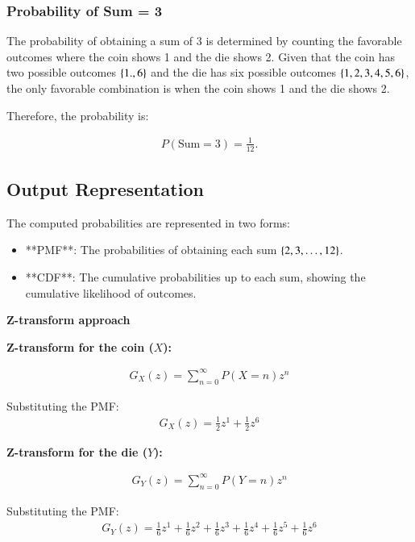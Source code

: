 \documentclass[journal]{IEEEtran}
\begin{document}
\subsubsection*{Probability of Sum = 3}
The probability of obtaining a sum of 3 is determined by counting the favorable outcomes where  the coin shows 1 and the die shows 2. Given that the coin has two possible outcomes $\left\{1.,6\right\}$ and the die has six possible outcomes $\left\{1,2,3,4,5,6\right\}$, the only favorable combination is when the coin shows 1 and the die shows 2.

Therefore, the probability is:

\begin{align}
    P(\text{Sum} = 3) = \frac{1}{12}.
\end{align}


\subsection*{Output Representation}
The computed probabilities are represented in two forms:
\begin{itemize}
    \item **PMF**: The probabilities of obtaining each sum $\left\{2, 3, \ldots, 12\right\}$.
    \item **CDF**: The cumulative probabilities up to each sum, showing the cumulative likelihood of outcomes.
\end{itemize}
\textbf{Z-transform approach}

\textbf{Z-transform for the coin (\(X\)):}

\begin{align}
    G_X(z) = \sum_{n=0}^\infty P(X=n) z^n
\end{align}



Substituting the PMF:
\begin{align}
    G_X(z) = \frac{1}{2}z^1 + \frac{1}{2}z^6
\end{align}

\textbf{Z-transform for the die (\(Y\)):}

\begin{align}
    G_Y(z) = \sum_{n=0}^\infty P(Y=n) z^n
\end{align}

Substituting the PMF:
\begin{align}
   G_Y(z) = \frac{1}{6}z^1 + \frac{1}{6}z^2 + \frac{1}{6}z^3 + \frac{1}{6}z^4 + \frac{1}{6}z^5 + \frac{1}{6}z^6 
\end{align}
\end{document}
